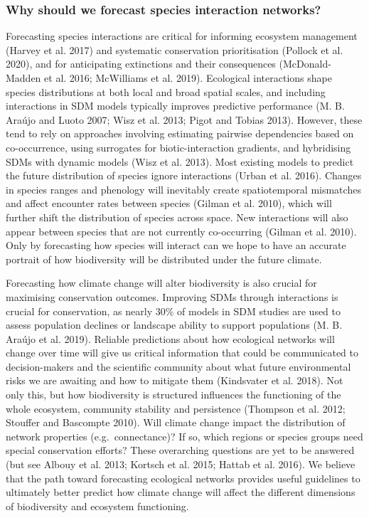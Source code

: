 \documentclass[10pt,oneside]{article}
\begin{document}
\hypertarget{why-should-we-forecast-species-interaction-networks}{%
\subsubsection{Why should we forecast species interaction
networks?}\label{why-should-we-forecast-species-interaction-networks}}

Forecasting species interactions are critical for informing ecosystem
management (Harvey et al. 2017) and systematic conservation
prioritisation (Pollock et al. 2020), and for anticipating extinctions
and their consequences (McDonald-Madden et al. 2016; McWilliams et al.
2019). Ecological interactions shape species distributions at both local
and broad spatial scales, and including interactions in SDM models
typically improves predictive performance (M. B. Araújo and Luoto 2007;
Wisz et al. 2013; Pigot and Tobias 2013). However, these tend to rely on
approaches involving estimating pairwise dependencies based on
co-occurrence, using surrogates for biotic-interaction gradients, and
hybridising SDMs with dynamic models (Wisz et al. 2013). Most existing
models to predict the future distribution of species ignore interactions
(Urban et al. 2016). Changes in species ranges and phenology will
inevitably create spatiotemporal mismatches and affect encounter rates
between species (Gilman et al. 2010), which will further shift the
distribution of species across space. New interactions will also appear
between species that are not currently co-occurring (Gilman et al.
2010). Only by forecasting how species will interact can we hope to have
an accurate portrait of how biodiversity will be distributed under the
future climate.

Forecasting how climate change will alter biodiversity is also crucial
for maximising conservation outcomes. Improving SDMs through
interactions is crucial for conservation, as nearly 30\% of models in
SDM studies are used to assess population declines or landscape ability
to support populations (M. B. Araújo et al. 2019). Reliable predictions
about how ecological networks will change over time will give us
critical information that could be communicated to decision-makers and
the scientific community about what future environmental risks we are
awaiting and how to mitigate them (Kindsvater et al. 2018). Not only
this, but how biodiversity is structured influences the functioning of
the whole ecosystem, community stability and persistence (Thompson et
al. 2012; Stouffer and Bascompte 2010). Will climate change impact the
distribution of network properties (e.g.~connectance)? If so, which
regions or species groups need special conservation efforts? These
overarching questions are yet to be answered (but see Albouy et al.
2013; Kortsch et al. 2015; Hattab et al. 2016). We believe that the path
toward forecasting ecological networks provides useful guidelines to
ultimately better predict how climate change will affect the different
dimensions of biodiversity and ecosystem functioning.
\end{document}
